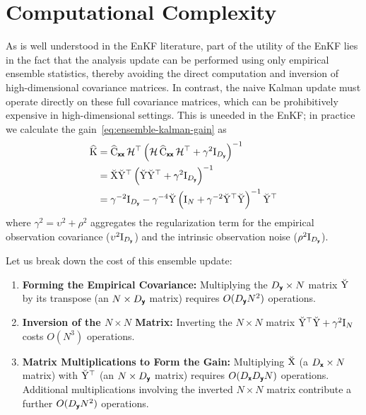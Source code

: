 \documentclass[wcp]{jmlr} %
\begin{document}
\section{Computational Complexity}
As is well understood in the EnKF literature, part of the  utility  of the EnKF lies in the fact that the analysis update can be performed using only empirical ensemble statistics, thereby avoiding the direct computation and inversion of high-dimensional covariance matrices.
In contrast, the naive Kalman update must operate directly on these full covariance matrices, which can be prohibitively expensive in high-dimensional settings.
This is uneeded in the EnKF; in practice we calculate the gain~\eqref{eq:ensemble-kalman-gain} as
\begin{align}
    \widehat{\mathrm{K}}&= \widehat{\mathrm{C}}_{\boldsymbol{\mathsf{xx}}}\, \mathcal{H}^\top \left(\mathcal{H}\,\widehat{\mathrm{C}}_{\boldsymbol{\mathsf{xx}}}\,\mathcal{H}^\top + \gamma^2\mathrm{I}_{D_{\boldsymbol{\mathsf{y}}}}\right)^{-1}\\
    &= \breve{\mathrm{X}} \breve{\mathrm{Y}}^\top   \left(
        \breve{\mathrm{Y}} \breve{\mathrm{Y}}^\top + \gamma^2 \mathrm{I}_{D_{\boldsymbol{\mathsf{y}}}}
    \right)^{-1}\\
    &= \gamma^{-2}\mathrm{I}_{D_{\boldsymbol{\mathsf{y}}}}
    - \gamma^{-4}\breve{\mathrm{Y}}
    \left(
        \mathrm{I}_N + \gamma^{-2}\breve{\mathrm{Y}}^\top\breve{\mathrm{Y}}
    \right)^{-1}
    \breve{\mathrm{Y}}^\top
\end{align}
where \(\gamma^2 = \upsilon^2 + \rho^2\) aggregates the regularization term for the empirical observation covariance (\(\upsilon^2\mathrm{I}_{D_{\boldsymbol{\mathsf{y}}}}\)) and the intrinsic observation noise (\(\rho^2\mathrm{I}_{D_{\boldsymbol{\mathsf{y}}}}\)).

Let us break down the cost of this ensemble update:

\begin{enumerate}
    \item \textbf{Forming the Empirical Covariance:}
    Multiplying the \(D_{\boldsymbol{\mathsf{y}}}\times N\) matrix \(\breve{\mathrm{Y}}\) by its transpose (an \(N\times D_{\boldsymbol{\mathsf{y}}}\) matrix) requires \(O(D_{\boldsymbol{\mathsf{y}}}N^2)\) operations.

    \item \textbf{Inversion of the \(N\times N\) Matrix:}
    Inverting the \(N\times N\) matrix \(\breve{\mathrm{Y}}^\top \breve{\mathrm{Y}} + \gamma^2\mathrm{I}_N\) costs \(O(N^3)\) operations.

    \item \textbf{Matrix Multiplications to Form the Gain:}
    Multiplying \(\breve{\mathrm{X}}\) (a \(D_{\boldsymbol{\mathsf{x}}}\times N\) matrix) with \(\breve{\mathrm{Y}}^\top\) (an \(N\times D_{\boldsymbol{\mathsf{y}}}\) matrix) requires \(O(D_{\boldsymbol{\mathsf{x}}}D_{\boldsymbol{\mathsf{y}}}N)\) operations. Additional multiplications involving the inverted \(N\times N\) matrix contribute a further \(O(D_{\boldsymbol{\mathsf{y}}}N^2)\) operations.
\end{enumerate}
\end{document}
